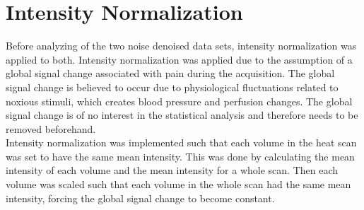\section{Intensity Normalization}

Before analyzing of the two noise denoised data sets, intensity normalization was applied to both. Intensity normalization was applied due to the assumption of a global signal change associated with pain during the acquisition. The global signal change is believed to occur due to physiological fluctuations related to noxious stimuli, which creates blood pressure and perfusion changes. The global signal change is of no interest in the statistical analysis and therefore needs to be removed beforehand. \cite{Macey2004} \\
Intensity normalization was implemented such that each volume in the heat scan was set to have the same mean intensity. This was done by calculating the mean intensity of each volume and the mean intensity for a whole scan. Then each volume was scaled such that each volume in the whole scan had the same mean intensity, forcing the global signal change to become constant.  